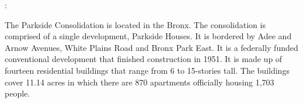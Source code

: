 :  

   

The Parkside Consolidation is located in the Bronx. The consolidation is comprised of a single development, Parkside Houses. It is bordered by Adee and Arnow Avenues, White Plains Road and Bronx Park East. It is a federally funded conventional development that finished construction in 1951. It is made up of fourteen residential buildings that range from 6 to 15-stories tall. The buildings cover 11.14 acres in which there are 870 apartments officially housing 1,703 people.    